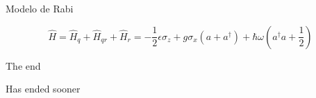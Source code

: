 \documentclass[spanish]{beamer}
\begin{document}
\begin{frame}{Modelo de Rabi}
\protect\hypertarget{modelo-de-rabi}{}
  
$$\hat{H} = \hat{H}_q + \hat{H}_{qr} + \hat{H}_r = -\frac{1}{2} \epsilon \sigma_z + g \sigma_x (a+a^\dag) + \hbar \omega (a^\dag a + \frac{1}{2})$$

\end{frame}

\begin{frame}{The end}
\protect\hypertarget{the-end}{}

Has ended sooner

\end{frame}
\end{document}
